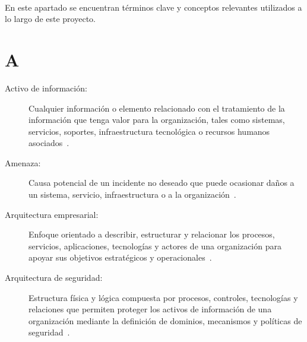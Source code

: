 \label{cap:glosario}
\mbox{}\\
En este apartado se encuentran términos clave y conceptos relevantes utilizados a lo largo de este proyecto.

\section*{A}
\begin{description}
	\item[Activo de información:] Cualquier información o elemento relacionado con el tratamiento de la información que tenga valor para la organización, tales como sistemas, servicios, soportes, infraestructura tecnológica o recursos humanos asociados~\cite{ISO27000Glossary}.
	
	\item[Amenaza:] Causa potencial de un incidente no deseado que puede ocasionar daños a un sistema, servicio, infraestructura o a la organización~\cite{ISO27000Glossary}.
	
	\item[Arquitectura empresarial:] Enfoque orientado a describir, estructurar y relacionar los procesos, servicios, aplicaciones, tecnologías y actores de una organización para apoyar sus objetivos estratégicos y operacionales~\cite{togaf-standard}.
	
	\item[Arquitectura de seguridad:] Estructura física y lógica compuesta por procesos, controles, tecnologías y relaciones que permiten proteger los activos de información de una organización mediante la definición de dominios, mecanismos y políticas de seguridad~\cite{NISTSecurityArchitecture}.
\end{description}


